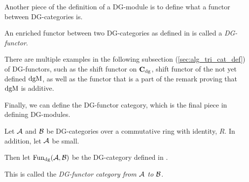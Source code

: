 Another piece of the definition of a DG-module is to define what a functor between DG-categories is.

\begin{definition}[DG-functor]
    An enriched functor between two DG-categories as defined in \cite[Definition 6.2.3]{Borceux_1994} is called a \emph{DG-functor}.
\end{definition}

There are multiple examples in the following subsection (\autoref{sec:alg_tri_cat_def}) of DG-functors, such as the shift functor on \( \operatorname{\mathbf{C}}_{\operatorname{dg}} \), shift functor of the not yet defined \( \operatorname{dgM} \), as well as the functor that is a part of the remark proving that \( \operatorname{dgM} \) is additive.

Finally, we can define the DG-functor category, which is the final piece in defining DG-modules.

\begin{definition}
    \label{def:dg_functor_category}
    Let \( {\mathcal{A}} \) and \( {\mathcal{B}} \) be DG-categories over a commutative ring with identity, \( R \). In addition, let \( {\mathcal{A}} \) be small.

    Then let \( \operatorname{Fun}_{\operatorname{dg}}({\mathcal{A}}, {\mathcal{B}}) \) be the DG-category defined in \cite[Proposition 6.3.1]{Borceux_1994}.



    This is called the \emph{DG-functor category from \( {\mathcal{A}} \) to \( {\mathcal{B}} \)}.
\end{definition}

